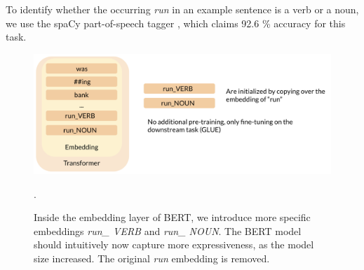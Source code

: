 \documentclass[a4paper,12pt,twoside,openright]{report}
\begin{document}
To identify whether the occurring \textit{run} in an example sentence is a verb or a noun, we use the spaCy part-of-speech tagger \cite{spacyb}, which claims 92.6 \% accuracy for this task.

\begin{figure}[h]
	\center
  \includegraphics[width=\linewidth]{./assets/experiments/pipeline_model_BERnie_POS_initialization.png}
  \caption{Inside the embedding layer of BERT, we introduce more specific embeddings \textit{run\_ VERB} and \textit{run\_ NOUN}. The BERT model should intuitively now capture more expressiveness, as the model size increased. The original \textit{run} embedding is removed.}.
  \label{fig:BERnie_POS_pipeline}
\end{figure}
\end{document}

